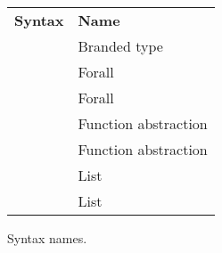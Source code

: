 \begin{figure}[p]

\onehalfspacing
\centering
\begin{tabular}{rl}

\textbf{Syntax} & \textbf{Name} \\

\csbrand{\varbrand}{\varty} & Branded type \\
\tyfor{\tyvar}{\varty} & Forall \\
\csfor{\csvar}{\varcs} & Forall \\
\tyfun{\varty}{\varty} & Function abstraction \\
\csfun{\varcs}{\varcs} & Function abstraction \\
\tylist{\varty} & List \\
\cslist{\varcs} & List \\

\end{tabular}

\caption{Syntax names.}
\label{figsyntax2}
\end{figure}